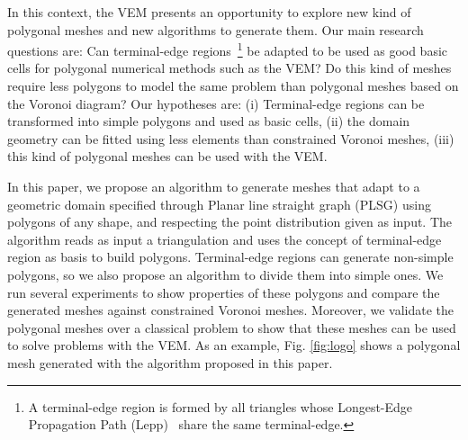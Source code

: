 \documentclass[lineno,pdflatex,sn-mathphys]{sn-jnl}%
\theoremstyle{thmstyleone}%
\theoremstyle{thmstyletwo}%
\theoremstyle{thmstylethree}%
\begin{document}
In this context, the VEM presents an opportunity to explore new kind of polygonal meshes and new algorithms to generate them. 
Our main research questions are: Can terminal-edge regions~\footnote{A terminal-edge region is formed by all triangles whose Longest-Edge Propagation Path (Lepp)~\cite{Rivara97} share the same terminal-edge.} be adapted to be used as good basic cells for polygonal numerical methods such as the VEM? Do this kind of meshes require less polygons to model the same problem than polygonal meshes based on the Voronoi diagram? Our hypotheses are: (i) Terminal-edge regions can be transformed into simple polygons and used  as basic cells, (ii) the domain geometry can be fitted using less elements than constrained Voronoi meshes, (iii) this kind of polygonal meshes can be used with the VEM. 

In this paper, we propose an algorithm to generate meshes that adapt to a geometric domain specified through  Planar line straight graph (PLSG) using  polygons of any shape, and respecting the  point distribution given as input. The algorithm reads as input a triangulation and uses the concept of terminal-edge region as basis to build polygons. 
Terminal-edge regions can generate non-simple polygons, so we also propose an algorithm to divide  them into simple ones. We  run several experiments to show  properties of these polygons and compare the generated meshes against constrained Voronoi meshes. Moreover, we  validate the polygonal meshes over a classical problem to show that these meshes can be used to solve problems with the VEM.   As an example, Fig. \ref{fig:logo} shows a polygonal mesh generated  with the algorithm proposed in this paper.
\end{document}
